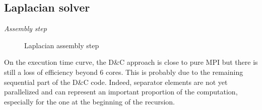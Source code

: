 \documentclass{IOS-Book-Article}
\begin{document}
\subsection{Laplacian solver}
\emph{Assembly step}\\
\begin{figure}[htp]
 \centering
 \hspace{1em}%
 \caption{Laplacian assembly step}
\end{figure}

On the execution time curve, the D\&C approach is close to pure MPI but there is still a loss of efficiency beyond 6 cores.
This is probably due to the remaining sequential part of the D\&C code. Indeed, separator elements are not yet parallelized and can represent an important proportion
of the computation, especially for the one at the beginning of the recursion.
\end{document}
